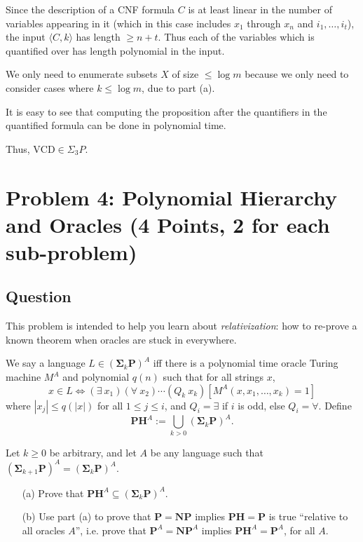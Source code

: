 \documentclass{article}
\renewcommand{\P}{\mathbf{P}}
\newcommand{\NP}{\mathbf{NP}}
\newcommand{\PH}{\mathbf{PH}}
\begin{document}
Since the description of a CNF formula $C$ is at least linear in the number of variables appearing in it (which in this case includes $x_1$ through $x_n$ and $i_1, \dots, i_t$), the input $\langle C, k \rangle$ has length $\geq n + t$.  Thus each of the variables which is quantified over has length polynomial in the input.

We only need to enumerate subsets $X$ of size $\leq \log m$ because we only need to consider cases where $k \leq \log m$, due to part (a).

It is easy to see that computing the proposition after the quantifiers in the quantified formula can be done in polynomial time.

Thus, $\text{VCD} \in \Sigma_3 P$.
   
\newpage
\section*{Problem 4: Polynomial Hierarchy and Oracles (4 Points, 2 for each sub-problem)}

\subsection*{Question}
This problem is intended to help you learn about \emph{relativization}: how to re-prove a known theorem when oracles are stuck in everywhere.

We say a language $L\in (\mathbf{\Sigma}_k \P)^A$ iff there is a polynomial time oracle Turing machine $M^A$ and polynomial $q(n)$ such that for all strings $x$,
	\[
		x\in L \Leftrightarrow (\exists~ x_1)(\forall~ x_2)\cdots (Q_k~ x_k) [M^A(x,x_1,\ldots,x_k)=1]
	\] where $|x_j| \leq q(|x|)$ for all $1\leq j\leq i$, and $Q_i = \exists$ if $i$ is odd, else $Q_i = \forall$. Define \[\PH^A := \bigcup_{k>0} (\mathbf{\Sigma}_k \P)^A.\] 

Let $k \geq 0$ be arbitrary, and let $A$ be any language such that $(\mathbf{\Sigma}_{k+1} \P)^A=(\mathbf{\Sigma}_k \P)^A$. \\

\begin{enumerate}

\item[(a)] Prove that $\PH^A\subseteq (\mathbf{\Sigma}_k \P)^A$. 
\item[(b)] Use part (a) to prove that $\P = \NP$ implies $\PH = \P$ is true ``relative to all oracles $A$'', i.e. prove that $\P^A = \NP^A$ implies $\PH^A = \P^A$, for all $A$.
\end{enumerate}
\end{document}
